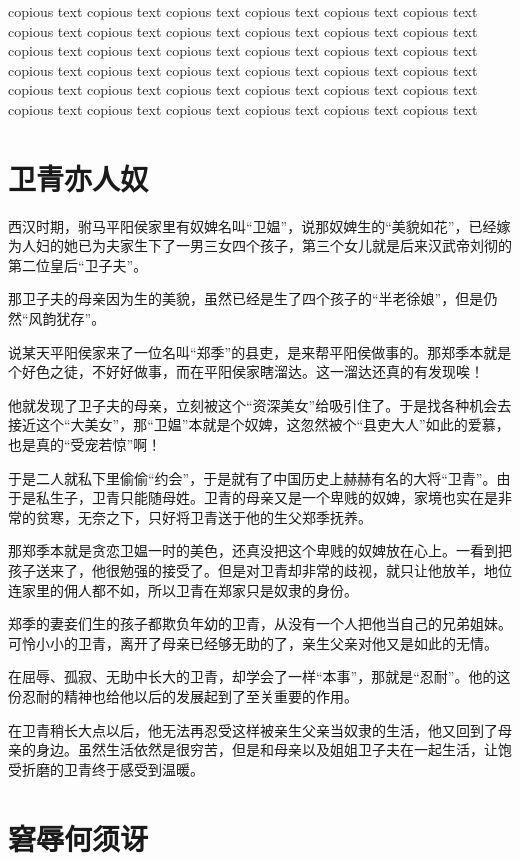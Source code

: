 \documentclass[UTF8,cap,nofonts,openany,twoside]{ctexbook}
\begin{document}
\noindent copious text copious text copious text copious text copious text copious text copious text copious text copious text copious text copious text copious text copious text copious text copious text copious text copious text copious text copious text copious text copious text copious text copious text copious text copious text copious text copious text copious text copious text copious text copious text copious text copious text copious text copious text copious text

\chapter{卫青亦人奴}

西汉时期，驸马平阳侯家里有奴婢名叫“卫媪”，说那奴婢生的“美貌如花”，已经嫁为人妇的她已为夫家生下了一男三女四个孩子，第三个女儿就是后来汉武帝刘彻的第二位皇后“卫子夫”。

那卫子夫的母亲因为生的美貌，虽然已经是生了四个孩子的“半老徐娘”，但是仍然“风韵犹存”。

说某天平阳侯家来了一位名叫“郑季”的县吏，是来帮平阳侯做事的。那郑季本就是个好色之徒，不好好做事，而在平阳侯家瞎溜达。这一溜达还真的有发现唉！

他就发现了卫子夫的母亲，立刻被这个“资深美女”给吸引住了。于是找各种机会去接近这个“大美女”，那“卫媪”本就是个奴婢，这忽然被个“县吏大人”如此的爱慕，也是真的“受宠若惊”啊！

于是二人就私下里偷偷“约会”，于是就有了中国历史上赫赫有名的大将“卫青”。由于是私生子，卫青只能随母姓。卫青的母亲又是一个卑贱的奴婢，家境也实在是非常的贫寒，无奈之下，只好将卫青送于他的生父郑季抚养。

那郑季本就是贪恋卫媪一时的美色，还真没把这个卑贱的奴婢放在心上。一看到把孩子送来了，他很勉强的接受了。但是对卫青却非常的歧视，就只让他放羊，地位连家里的佣人都不如，所以卫青在郑家只是奴隶的身份。

郑季的妻妾们生的孩子都欺负年幼的卫青，从没有一个人把他当自己的兄弟姐妹。可怜小小的卫青，离开了母亲已经够无助的了，亲生父亲对他又是如此的无情。

在屈辱、孤寂、无助中长大的卫青，却学会了一样“本事”，那就是“忍耐”。他的这份忍耐的精神也给他以后的发展起到了至关重要的作用。

在卫青稍长大点以后，他无法再忍受这样被亲生父亲当奴隶的生活，他又回到了母亲的身边。虽然生活依然是很穷苦，但是和母亲以及姐姐卫子夫在一起生活，让饱受折磨的卫青终于感受到温暖。

\chapter{窘辱何须讶}
\end{document}
